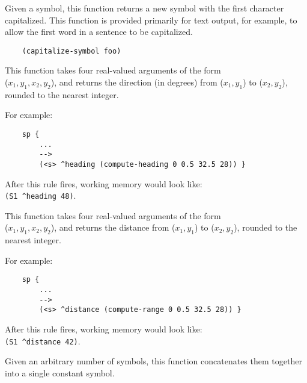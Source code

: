 \begin{description}

\item [\soarb{capitalize-symbol} --- ]
	Given a symbol, this function returns a new symbol with the first character capitalized. This function is provided primarily for text output, for example, to allow the first word in a sentence to be capitalized.


	\begin{verbatim}
	(capitalize-symbol foo)
	\end{verbatim}


\item [\soarb{compute-heading} --- ]
	This function takes four real-valued arguments of the form \\
	($x_1, y_1, x_2, y_2$), and returns the direction (in degrees) from ($x_1, y_1$) to ($x_2, y_2$), rounded to the nearest integer.

	For example:

	\begin{verbatim}
	sp {
	    ...
	    -->
	    (<s> ^heading (compute-heading 0 0.5 32.5 28)) }
	\end{verbatim}

	After this rule fires, working memory would look like: \\
	\verb|(S1 ^heading 48)|.


\item [\soarb{compute-range} --- ]
	This function takes four real-valued arguments of the form \\
	($x_1, y_1, x_2, y_2$), and returns the distance from ($x_1, y_1$) to ($x_2, y_2$), rounded to the nearest integer.

	For example:

	\begin{verbatim}
	sp {
	    ...
	    -->
	    (<s> ^distance (compute-range 0 0.5 32.5 28)) }
	\end{verbatim}

	After this rule fires, working memory would look like: \\
	\verb|(S1 ^distance 42)|.


\item [\soarb{concat} --- ]
	Given an arbitrary number of symbols, this function concatenates them together into a single constant symbol.


\end{description}
